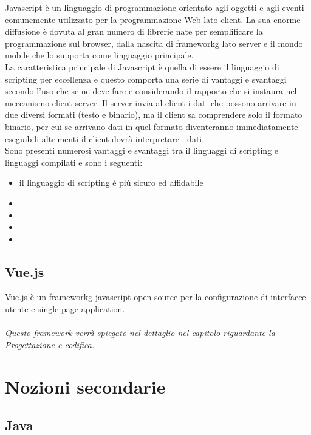Javascript è un linguaggio di programmazione orientato agli oggetti e agli eventi comunemente utilizzato per la programmazione Web lato client. La sua enorme diffusione è dovuta al gran numero di librerie nate per semplificare la programmazione sul browser, dalla nascita di \gls{frameworkg} lato server e il mondo mobile che lo supporta come linguaggio principale.\\
La caratteristica principale di Javascript è quella di essere il linguaggio di scripting per eccellenza e questo comporta una serie di vantaggi e svantaggi secondo l'uso che se ne deve fare e considerando il rapporto che si instaura nel meccanismo client-server. Il server invia al client i dati che possono arrivare in due diversi formati (testo e binario), ma il client sa comprendere solo il formato binario, per cui se arrivano dati in quel formato diventeranno immediatamente eseguibili altrimenti il client dovrà interpretare i dati.\\
Sono presenti numerosi vantaggi e svantaggi tra il linguaggi di scripting e linguaggi compilati e sono i seguenti:
\begin{itemize}
	\item il linguaggio di scripting è più sicuro ed affidabile
	\item
	\item
	\item
	\item
\end{itemize}

\subsection{Vue.js}

Vue.js è un \gls{frameworkg} javascript open-source per la configurazione di interfacce utente e single-page application.\\
\\
\textit{Questo framework verrà spiegato nel dettaglio nel capitolo riguardante la Progettazione e codifica.}

\section{Nozioni secondarie}

\subsection{Java}

